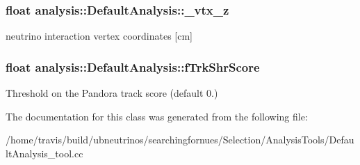 \subsubsection[{\texorpdfstring{\+\_\+vtx\+\_\+z}{_vtx_z}}]{\setlength{\rightskip}{0pt plus 5cm}float analysis\+::\+Default\+Analysis\+::\+\_\+vtx\+\_\+z\hspace{0.3cm}{\ttfamily [private]}}\hypertarget{classanalysis_1_1DefaultAnalysis_afd279ca3ddc976b3d509e6c09c0c1514}{}\label{classanalysis_1_1DefaultAnalysis_afd279ca3ddc976b3d509e6c09c0c1514}
neutrino interaction vertex coordinates \mbox{[}cm\mbox{]} 
\subsubsection[{\texorpdfstring{f\+Trk\+Shr\+Score}{fTrkShrScore}}]{\setlength{\rightskip}{0pt plus 5cm}float analysis\+::\+Default\+Analysis\+::f\+Trk\+Shr\+Score\hspace{0.3cm}{\ttfamily [private]}}\hypertarget{classanalysis_1_1DefaultAnalysis_aba718fab9e0072c6a046b9f9aa3670bf}{}\label{classanalysis_1_1DefaultAnalysis_aba718fab9e0072c6a046b9f9aa3670bf}
Threshold on the Pandora track score (default 0.) 

The documentation for this class was generated from the following file\+:\begin{DoxyCompactItemize}
\item 
/home/travis/build/ubneutrinos/searchingfornues/\+Selection/\+Analysis\+Tools/Default\+Analysis\+\_\+tool.\+cc\end{DoxyCompactItemize}

